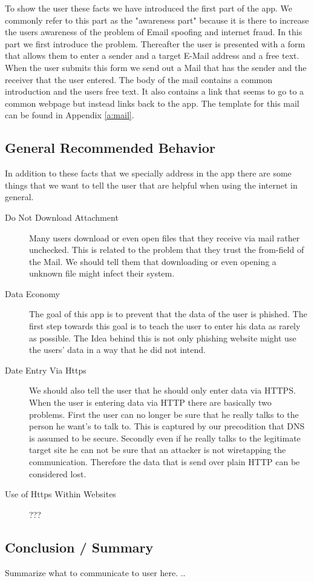 To show the user these facts we have introduced the first part of the app.
We commonly refer to this part as the "awareness part" because it is there to increase the users awareness of the problem of Email spoofing and internet fraud.
In this part we first introduce the problem.
Thereafter the user is presented with a form that allows them to enter a sender and a target E-Mail address and a free text.
When the user submits this form we send out a Mail that has the sender and the receiver that the user entered.
The body of the mail contains a common introduction and the users free text.
It also contains a link that seems to go to a common webpage but instead links back to the app.
The template for this mail can be found in Appendix \ref{a:mail}.

\subsection{General Recommended Behavior}

In addition to these facts that we specially address in the app there are some things that we want to tell the user that are helpful when using the internet in general.
\begin{description}
	\item[Do Not Download Attachment] Many users download or even open files that they receive via mail rather unchecked.
	This is related to the problem that they trust the from-field of the Mail.
	We should tell them that downloading or even opening a unknown file might infect their system.
	\item[Data Economy] The goal of this app is to prevent that the data of the user is phished.
	The first step towards this goal is to teach the user to enter his data as rarely as possible.
	The Idea behind this is not only phishing website might use the users' data in a way that he did not intend. 
	\item[Date Entry Via Https] We should also tell the user that he should only enter data via HTTPS. 
	When the user is entering data via HTTP there are basically two problems.
	First the user can no longer be sure that he really talks to the person he want's to talk to.
	This is captured by our precodition that DNS is assumed to be secure.
	Secondly even if he really talks to the legitimate target site he can not be sure that an attacker is not wiretapping the communication.
	Therefore the data that is send over plain HTTP can be considered lost.	
	\item[Use of Https Within Websites] ???
\end{description}

\subsection{Conclusion / Summary}

Summarize what to communicate to user here.
..


